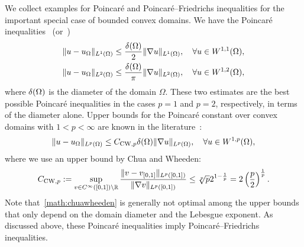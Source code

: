 \documentclass[10pt,a4paper]{article}
\begin{document}
We collect examples for Poincar\'e and Poincar\'e--Friedrichs inequalities for the important special case of bounded convex domains. 
We have the Poincar\'e inequalities~\cite{Pay_Wei_Poin_conv_60,bebendorf2003note,acosta2004optimal} (or~\cite[Lemma~3.24]{ern2021finite}) 
\begin{align}\label{math:acostaduran}
    \| u - u_{\Omega} \|_{L^{1}(\Omega)}
    \leq 
    \frac{{\delta}(\Omega)}{2}
    \| \nabla u \|_{L^{1}(\Omega)}
    ,
    \quad 
    \forall 
    u \in W^{1,1}(\Omega)
    ,
    \\
    \| u - u_{\Omega} \|_{L^{2}(\Omega)}\label{math:bebendorf}
    \leq 
    \frac{{\delta}(\Omega)}{\pi}
    \| \nabla u \|_{L^{2}(\Omega)}
    ,
    \quad 
    \forall 
    u \in W^{1,2}(\Omega)
    ,
\end{align}
where ${\delta}(\Omega)$ is the diameter of the domain $\Omega$.
These two estimates are the best possible Poincar\'e inequalities in the cases $p=1$ and $p=2$, respectively, in terms of the diameter alone. 
Upper bounds for the Poincar\'e constant over convex domains with $1 < p < \infty$ are known in the literature~\cite[Theorem~1.1, Theorem~1.2]{chua2006estimates}:
\begin{align}\label{math:chuawheeden}
    \| u - u_{\Omega} \|_{L^{p}(\Omega)}
    \leq 
    C_{{\rm CW},p}
    {\delta}(\Omega)
    \| \nabla u \|_{L^{p}(\Omega)}
    ,
    \quad 
    \forall 
    u \in W^{1,p}(\Omega)
    ,
\end{align}
where we use an upper bound by Chua and Wheeden:
\begin{align*}
    C_{{\rm CW},p} 
    := 
    \sup\limits_{ v \in C^\infty([0,1]) \setminus {\mathbb R} } 
    \frac{ 
        \| v - v_{[0,1]} \|_{L^{p}([0,1])} 
    }{ 
        \| \nabla v \|_{L^{p}([0,1])} 
    }
    \leq 
    \sqrt[p]{p} 2^{1-\frac 1 p}
    =
    2
    \left( \frac p 2 \right)^{\frac 1 p}
    .
\end{align*} 
Note that~\eqref{math:chuawheeden} is generally not optimal among the upper bounds that only depend on the domain diameter and the Lebesgue exponent.
As discussed above, these Poincar\'e inequalities imply Poincar\'e--Friedrichs inequalities. 
\end{document}
